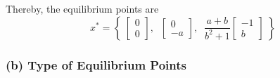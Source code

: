 Thereby, the equilibrium points are
\begin{equation*}
    \boxed{
        x^* =
        \left \{ \;
        \begin{bmatrix}
            0 \\
            0
        \end{bmatrix}, \; \;
        \begin{bmatrix}
            0 \\
            -a
        \end{bmatrix}, \; \;
        \frac{a+b}{b^2 + 1}
        \begin{bmatrix}
            -1 \\
            b
        \end{bmatrix} \;
        \right \}
    }
\end{equation*}

\subsubsection*{(b) Type of Equilibrium Points}


